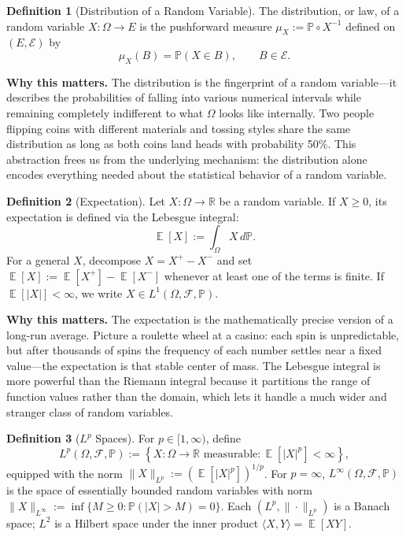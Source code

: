 \documentclass[11pt,a4paper,openany]{book}
\theoremstyle{definition}
\newtheorem{definition}{Definition}[chapter]
\theoremstyle{plain}
\theoremstyle{remark}
\DeclareMathOperator{\E}{\mathbb{E}}
\newcommand{\1}{\mathbbm{1}}
\newcommand{\R}{\mathbb{R}}
\newcommand{\F}{\mathcal{F}}
\newcommand{\Pbb}{\mathbb{P}}
\newcommand{\calE}{\mathcal{E}}
\begin{document}
\begin{definition}[Distribution of a Random Variable]
The distribution, or law, of a random variable $X: \Omega \to E$ is the pushforward measure $\mu_{X} := \Pbb \circ X^{-1}$ defined on $(E, \calE)$ by
\[
\mu_{X}(B) = \Pbb(X \in B), \qquad B \in \calE.
\]
\end{definition}

\medskip
\noindent\textbf{Why this matters.} The distribution is the fingerprint of a random variable---it describes the probabilities of falling into various numerical intervals while remaining completely indifferent to what $\Omega$ looks like internally. Two people flipping coins with different materials and tossing styles share the same distribution as long as both coins land heads with probability 50\%. This abstraction frees us from the underlying mechanism: the distribution alone encodes everything needed about the statistical behavior of a random variable.

\begin{definition}[Expectation]
Let $X: \Omega \to \R$ be a random variable. If $X \geq 0$, its expectation is defined via the Lebesgue integral:
\[
\E[X] := \int_{\Omega} X \, d\Pbb.
\]
For a general $X$, decompose $X = X^{+} - X^{-}$ and set $\E[X] := \E[X^{+}] - \E[X^{-}]$ whenever at least one of the terms is finite. If $\E[|X|] < \infty$, we write $X \in L^{1}(\Omega, \F, \Pbb)$.
\end{definition}

\medskip
\noindent\textbf{Why this matters.} The expectation is the mathematically precise version of a long-run average. Picture a roulette wheel at a casino: each spin is unpredictable, but after thousands of spins the frequency of each number settles near a fixed value---the expectation is that stable center of mass. The Lebesgue integral is more powerful than the Riemann integral because it partitions the range of function values rather than the domain, which lets it handle a much wider and stranger class of random variables.

\begin{definition}[$L^{p}$ Spaces]
For $p \in [1, \infty)$, define
\[
L^{p}(\Omega, \F, \Pbb) := \left\{X : \Omega \to \R \text{ measurable} : \E[|X|^{p}] < \infty \right\},
\]
equipped with the norm $\|X\|_{L^{p}} := (\E[|X|^{p}])^{1/p}$. For $p = \infty$, $L^{\infty}(\Omega, \F, \Pbb)$ is the space of essentially bounded random variables with norm $\|X\|_{L^{\infty}} := \inf\{M \geq 0 : \Pbb(|X| > M) = 0\}$. Each $(L^{p}, \|\cdot\|_{L^{p}})$ is a Banach space; $L^{2}$ is a Hilbert space under the inner product $\langle X, Y \rangle = \E[XY]$.
\end{definition}
\end{document}
